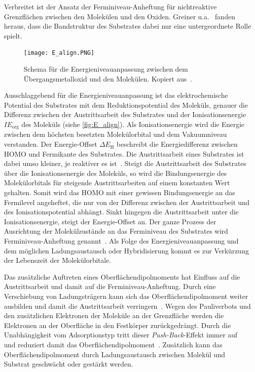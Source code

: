             Verbreitet ist der Ansatz der Ferminiveau-Anheftung für nichtreaktive Grenzflächen zwischen den Molekülen und den Oxiden.
            Greiner u.a.~\cite{IF_3} fanden heraus, dass die Bandstruktur des Substrates dabei nur eine untergeordnete Rolle spielt.
            \begin{figure}
                \centering
                \texttt{[image: E\_align.PNG]}
                \caption{Schema für die Energieniveauanpassung zwischen dem Übergangsmetalloxid und den Molekülen. Kopiert aus~\cite{IF_3}.}
                \label{fig:E_align}
            \end{figure}
            Ausschlaggebend für die Energieniveauanpassung ist das elektrochemische Potential des Substrates mit dem Reduktionspotential des Moleküls, genauer die Differenz zwischen der Austrittsarbeit des Substrates und der Ionisationsenergie $IE_\text{org}$ des Moleküls (siehe \autoref{fig:E_align}).
            Als Ionisationsenergie wird die Energie zwischen dem höchsten besetzten Molekülorbital und dem Vakuumniveau verstanden.
            Der Energie-Offset $\Delta E_\text{H}$ beschreibt die Energiedifferenz zwischen HOMO und Fermikante des Substrates.
            Die Austrittsarbeit eines Substrates ist dabei umso kleiner, je reaktiver es ist~\cite{5A_5}.
            Steigt die Austrittsarbeit des Substrates über die Ionisationsenergie des Moleküls, so wird die Bindungsenergie des Molekülorbitals für steigende Austrittsarbeiten auf einem konstanten Wert gehalten.
            Somit wird das HOMO mit einer gewissen Bindungsenergie an das Fermilevel angeheftet, die nur von der Differenz zwischen der Austrittsarbeit und des Ionisationspotential abhängt.
            Sinkt hingegen die Austrittsarbeit unter die Ionisationsenergie, steigt der Energie-Offset an.
            Der ganze Prozess der Ausrichtung der Molekülzustände an das Ferminiveau des Substrates wird Ferminiveau-Anheftung genannt~\cite{IF_3}.
            Als Folge des Energieniveauanpassung und dem möglichen Ladungsaustausch oder Hybridisierung kommt es zur Verkürzung der Lebenszeit der Molekülorbitale.

            Das zusätzliche Auftreten eines Oberflächendipolmoments hat Einfluss auf die Austrittsarbeit und damit auf die Ferminiveau-Anheftung.
            Durch eine Verschiebung von Ladungsträgern kann sich das Oberflächendipolmoment weiter ausbilden und damit die Austrittsarbeit verringern~\cite{5A_5}.
            Wegen des Pauliverbots und den zusätzlichen Elektronen der Moleküle an der Grenzfläche werden die Elektronen an der Oberfläche in den Festkörper zurückgedrängt.
            Durch die Unabhängigkeit vom Adsorptionstyp tritt dieser \textit{Push-Back}-Effekt immer auf~\cite{IF_4} und reduziert damit das Oberflächendipolmoment~\cite{IF_1}.
            Zusätzlich kann das Oberflächendipolmoment durch Ladungsaustausch zwischen Molekül und Substrat geschwächt oder gestärkt werden.

